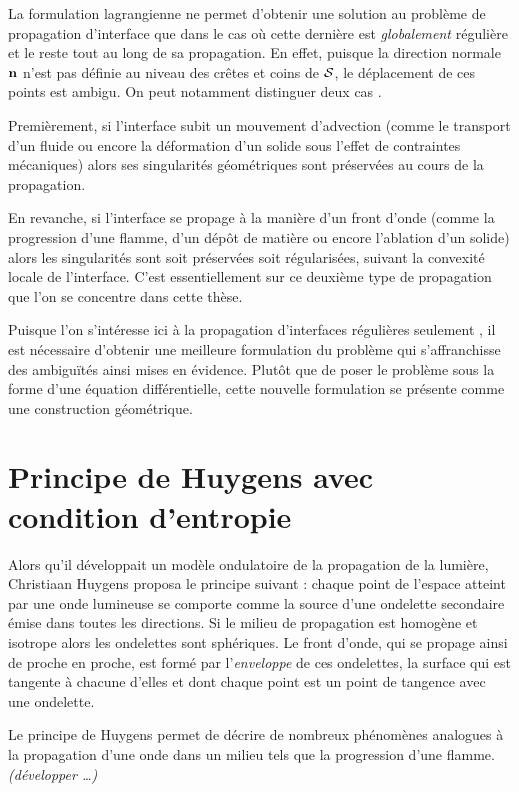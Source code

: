 \par\bigskip
La formulation lagrangienne ne permet d'obtenir une solution au problème de propagation d'interface que dans le cas où cette dernière est \textit{globalement} régulière et le reste tout au long de sa propagation. 
En effet, puisque la direction normale $\mathbf{n}$ n'est pas définie au niveau des crêtes et coins de $\mathcal{S}$, le déplacement de ces points est ambigu. 
On peut notamment distinguer deux cas \cite{jiao2007}.
\par
Premièrement, si l'interface subit un mouvement d'advection (comme le transport d'un fluide ou encore la déformation d'un solide sous l'effet de contraintes mécaniques) alors ses singularités géométriques sont préservées au cours de la propagation.
\par
En revanche, si l'interface se propage à la manière d'un front d'onde (comme la progression d'une flamme, d'un dépôt de matière ou encore l'ablation d'un solide) alors les singularités sont soit préservées soit régularisées, suivant la convexité locale de l'interface.
C'est essentiellement sur ce deuxième type de propagation que l'on se concentre dans cette thèse.
\par\bigskip
Puisque l'on s'intéresse ici à la propagation d'interfaces régulières seulement \piecewise, il est nécessaire d'obtenir une meilleure formulation du problème qui s'affranchisse des ambiguïtés ainsi mises en évidence. 
Plutôt que de poser le problème sous la forme d'une équation différentielle, cette nouvelle formulation se présente comme une construction géométrique.

\section{Principe de Huygens avec condition d'entropie}
\label{section:principe_huygens}
\def\p{\vit{p}}
\def\q{\vit{q}}
%
Alors qu'il développait un modèle ondulatoire de la propagation de la lumière, Christiaan Huygens proposa le principe suivant : chaque point de l'espace atteint par une onde lumineuse se comporte comme la source d'une ondelette secondaire émise dans toutes les directions. 
Si le milieu de propagation est homogène et isotrope alors les ondelettes sont sphériques. 
Le front d'onde, qui se propage ainsi de proche en proche, est formé par l'\textit{enveloppe} de ces ondelettes, \ie la surface qui est tangente à chacune d'elles et dont chaque point est un point de tangence avec une ondelette.
\par
Le principe de Huygens permet de décrire de nombreux phénomènes analogues à la propagation d'une onde dans un milieu tels que la progression d'une flamme. 
\textit{(développer \ldots)}

